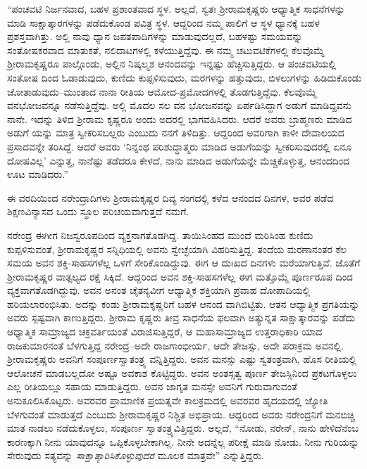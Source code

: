 “ಪಂಚವಟಿ ನಿರ್ಜನವಾದ, ಬಹಳ ಪ್ರಶಾಂತವಾದ ಸ್ಥಳ. ಅಲ್ಲದೆ, ಸ್ವತಃ ಶ್ರೀರಾಮಕೃಷ್ಣರು ಆಧ್ಯಾತ್ಮಿಕ ಸಾಧನೆಗಳನ್ನು ಮಾಡಿ ಸಾಕ್ಷಾತ್ಕಾರಗಳನ್ನು ಪಡೆದುಕೊಂಡ ಪವಿತ್ರ ಸ್ಥಳ. ಆದ್ದರಿಂದ ನಮ್ಮ ಪಾಲಿಗೆ ಆ ಸ್ಥಳ ಧ್ಯಾನಕ್ಕೆ ಬಹಳ ಪ್ರಶಸ್ತವಾಗಿತ್ತು. ಅಲ್ಲಿ ನಾವು ಧ್ಯಾನ ಜಪತಪಾದಿಗಳನ್ನು ಮಾಡುವುದಲ್ಲದೆ, ಬಹಳಷ್ಟು ಸಮಯವನ್ನು ಸಂತೋಷಕರವಾದ ಮಾತುಕತೆ, ನಲಿದಾಟಗಳಲ್ಲಿ ಕಳೆಯುತ್ತಿದ್ದೆವು. ಈ ನಮ್ಮ ಚಟುವಟಿಕೆಗಳಲ್ಲಿ ಕೆಲವೊಮ್ಮೆ ಶ್ರೀರಾಮಕೃಷ್ಣರೂ ಪಾಲ್ಗೊಂಡು, ಅಲ್ಲಿನ ನಿಷ್ಕಲ್ಮಶ ಆನಂದವನ್ನು ಇನ್ನಷ್ಟು ಹೆಚ್ಚಿಸುತ್ತಿದ್ದರು. ಆ ಪಂಚವಟಿಯಲ್ಲಿ ಸಂತೋಷ ದಿಂದ ಓಡಾಡುವುದು, ಕುಣಿದು ಕುಪ್ಪಳಿಸುವುದು, ಮರಗಳನ್ನು ಹತ್ತುವುದು, ಬಿಳಲುಗಳನ್ನು ಹಿಡಿದುಕೊಂಡು ಜೋತಾಡುವುದು–ಮುಂತಾದ ನಾನಾ ರೀತಿಯ ಆಮೋದ-ಪ್ರಮೋದಗಳಲ್ಲಿ ತೊಡಗುತ್ತಿದ್ದೆವು. ಕೆಲವೊಮ್ಮೆ ವನಭೋಜವನ್ನೂ ನಡೆಸುತ್ತಿದ್ದೆವು. ಅಲ್ಲಿ ಮೊದಲ ಸಲ ವನ ಭೋಜನವನ್ನು ಏರ್ಪಡಿಸಿದ್ದಾಗ ಅಡುಗೆ ಮಾಡಿದ್ದವನು ನಾನೇ. ಇದನ್ನು ತಿಳಿದ ಶ್ರೀರಾಮ ಕೃಷ್ಣರೂ ಅಂದು ಅದರಲ್ಲಿ ಭಾಗವಹಿಸಿದರು. ಆದರೆ ಅವರು ಬ್ರಾಹ್ಮಣರು ಮಾಡಿದ ಅಡುಗೆ ಯನ್ನು ಮಾತ್ರ ಸ್ವೀಕರಿಸಬಲ್ಲರು ಎಂಬುದು ನನಗೆ ತಿಳಿದಿತ್ತು. ಆದ್ದರಿಂದ ಅವರಿಗಾಗಿ ಕಾಳೀ ದೇವಾಲಯದ ಪ್ರಸಾದವನ್ನೇ ತರಿಸಿದ್ದೆ. ಆದರೆ ಅವರು ‘ನಿನ್ನಂಥ ಪರಿಶುದ್ಧಾತ್ಮರು ಮಾಡಿದ ಅಡುಗೆಯನ್ನು ಸ್ವೀಕರಿಸುವುದರಲ್ಲಿ ಏನೂ ದೋಷವಿಲ್ಲ’ ಎನ್ನುತ್ತ, ನಾನೆಷ್ಟು ತಡೆದರೂ ಕೇಳದೆ, ನಾನು ಮಾಡಿದ ಅಡುಗೆಯನ್ನೇ ಮೆಚ್ಚಿಕೊಳ್ಳುತ್ತ, ಆನಂದದಿಂದ ಊಟ ಮಾಡಿದರು.”

ಈ ವರದಿಯಿಂದ ನರೇಂದ್ರಾದಿಗಳು ಶ್ರೀರಾಮಕೃಷ್ಣರ ದಿವ್ಯ ಸಂಗದಲ್ಲಿ ಕಳೆದ ಆನಂದದ ದಿನಗಳ, ಅವರ ಪಡೆದ ಶಿಕ್ಷಣವಿನ್ಯಾಸದ ಒಂದು ಸ್ಥೂಲ ಪರಿಚಯವಾಗುತ್ತದೆ ನಮಗೆ.

ನರೇಂದ್ರ ಈಗೀಗ ನಿಜಸ್ವರೂಪದಿಂದ ವ್ಯಕ್ತನಾಗತೊಡಗಿದ್ದ. ತಾಯಿಸಿಂಹದ ಮುಂದೆ ಮರಿಸಿಂಹ ಕುಣಿದು ಕುಪ್ಪಳಿಸುವಂತೆ, ಶ್ರೀರಾಮಕೃಷ್ಣರ ಸನ್ನಿಧಿಯಲ್ಲಿ ಅವನು ಸ್ವೇಚ್ಛೆಯಾಗಿ ವಿಹರಿಸುತ್ತಿದ್ದ. ತಂದೆಯ ಮರಣಾನಂತರ ಕೆಲ ಸಮಯ ಅವನ ಶಕ್ತಿ-ಸಾಹಸಗಳೆಲ್ಲ ಒಳಗೆ ಸೇರಿಕೊಂಡಿದ್ದುವು. ಈಗ ಆ ದುಃಖದ ದಿನಗಳು ಮರೆಯಾಗುತ್ತಿವೆ. ಜೊತೆಗೆ ಶ್ರೀರಾಮಕೃಷ್ಣರ ವಾತ್ಸಲ್ಯದ ರಕ್ಷೆ ಸಿಕ್ಕಿದೆ. ಆದ್ದರಿಂದ ಅವನ ಶಕ್ತಿ-ಸಾಹಸಗಳೆಲ್ಲ ಈಗ ಮತ್ತೊಮ್ಮೆ ಪೂರ್ಣರೂಪ ದಿಂದ ವ್ಯಕ್ತವಾಗತೊಡಗಿದ್ದುವು. ಅವನ ಅನಂತ ಚೈತನ್ಯವೀಗ ಆಧ್ಯಾತ್ಮಿಕ ಶಕ್ತಿಯಾಗಿ ಪ್ರವಾಹ ದೋಪಾದಿಯಲ್ಲಿ ಹರಿಯಲಾರಂಭಿಸಿತು. ಅದನ್ನು ಕಂಡು ಶ್ರೀರಾಮಕೃಷ್ಣರಿಗೆ ಬಹಳ ಆನಂದ ವಾಗಿಬಿಟ್ಟಿತು. ಆತನ ಆಧ್ಯಾತ್ಮಿಕ ಪ್ರಗತಿಯನ್ನು ಅವರು ಸ್ಪಷ್ಟವಾಗಿ ಕಾಣುತ್ತಿದ್ದರು. ಶ್ರೀರಾಮ ಕೃಷ್ಣರು ತೀವ್ರ ಸಾಧನೆಯ ಫಲವಾಗಿ ಅತ್ಯುನ್ನತ ಸಾಕ್ಷಾತ್ಕಾರವನ್ನು ಪಡೆದು ಆಧ್ಯಾತ್ಮಿಕ ಸಾಮ್ರಾಜ್ಯದ ಚಕ್ರವರ್ತಿಯಂತೆ ವಿರಾಜಿಸುತ್ತಿದ್ದರೆ, ಆ ಮಹಾಸಾಮ್ರಾಜ್ಯದ ಉತ್ತರಾಧಿಕಾರಿ ಯಾದ ರಾಜಕುಮಾರನಂತೆ ಬೆಳಗುತ್ತಿದ್ದ ನರೇಂದ್ರ–ಅದೇ ರಾಜಗಾಂಭೀರ್ಯ, ಆದೇ ತೇಜಸ್ಸು, ಅದೇ ಪರಾಕ್ರಮ ಅವನಲ್ಲಿ. ಶ್ರೀರಾಮಕೃಷ್ಣರು ಅವನಿಗೆ ಸಂಪೂರ್ಣಸ್ವಾತಂತ್ರ್ಯ ವನ್ನಿತ್ತಿದ್ದರು. ಅವನ ಮನಸ್ಸು ಎಷ್ಟು ಸ್ವತಂತ್ರವಾಗಿ, ಹೊಸ ರೀತಿಯಲ್ಲಿ ಆಲೋಚನೆ ಮಾಡಬಲ್ಲದೋ ಅಷ್ಟೂ ಅವಕಾಶ ಕೊಟ್ಟಿದ್ದರು. ಅವನ ಅಂತಸ್ಸತ್ವ ಪೂರ್ಣ ತೇಜಸ್ಸಿನಿಂದ ಪ್ರಕಟಗೊಳ್ಳಲು ಎಲ್ಲ ರೀತಿಯಲ್ಲೂ ಸಹಾಯ ಮಾಡುತ್ತಿದ್ದರು. ಅವನ ಜಾಗೃತ ಮನಸ್ಸೇ ಅವನಿಗೆ ಗುರುವಾಗುವಂತೆ ಅನುಕೂಲಿಸಿಕೊಟ್ಟರು. ಅವರವರ ಪ್ರಾಮಾಣಿಕ ಪ್ರಯತ್ನವೇ ಕಾಲಕ್ರಮದಲ್ಲಿ ಅವರವರ ಹೃದಯದಲ್ಲಿ ಜ್ಯೋತಿ ಬೆಳಗುವಂತೆ ಮಾಡುತ್ತದೆ ಎಂಬುದು ಶ್ರೀರಾಮಕೃಷ್ಣರ ನಿಶ್ಚಿತ ಅಭಿಪ್ರಾಯ. ಆದ್ದರಿಂದ ಅವರು ನರೇಂದ್ರನಿಗೆ ಮನಬಿಚ್ಚಿ ಮಾತ ನಾಡಲು ನಡೆದುಕೊಳ್ಳಲು, ಸಂಪೂರ್ಣ ಸ್ವಾತಂತ್ರ್ಯವಿತ್ತಿದ್ದರು. ಅಲ್ಲದೆ, “ನೋಡು, ನರೇನ್, ನಾನು ಹೇಳಿದೆನೆಂಬ ಕಾರಣಕ್ಕಾಗಿ ನೀನು ಯಾವುದನ್ನೂ ಒಪ್ಪಿಕೊಳ್ಳಬೇಕಾಗಿಲ್ಲ. ನೀನೇ ಅದನ್ನೆಲ್ಲ ಪರೀಕ್ಷೆ ಮಾಡಿ ನೋಡು. ನೀನು ಗುರಿಯನ್ನು ಸೇರುವುದು ಸತ್ಯವನ್ನು \textit{ಸಾಕ್ಷಾತ್ಕಾರಿಸಿಕೊಳ್ಳುವುದರ} ಮೂಲಕ ಮಾತ್ರವೇ” ಎನ್ನುತ್ತಿದ್ದರು.

